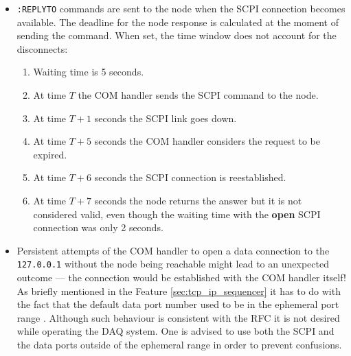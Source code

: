 \begin{itemize}
	\item{
		\texttt{:REPLYTO} commands are sent to the node when the SCPI connection becomes available. The deadline for the node response is calculated at the moment of sending the command. When set, the time window does not account for the disconnects:
		\begin{enumerate}
			\item Waiting time is 5 seconds.
			\item At time $T$ the COM handler sends the SCPI command to the node.
			\item At time $T + 1$ seconds the SCPI link goes down.
			\item At time $T + 5$ seconds the COM handler considers the request to be expired.
			\item At time $T + 6$ seconds the SCPI connection is reestablished.
			\item At time $T + 7$ seconds the node returns the answer but it is not considered valid, even though the waiting time with the \textbf{open} SCPI connection was only 2 seconds.
		\end{enumerate}
	}
	\item Persistent attempts of the COM handler to open a data connection to the \texttt{127.0.0.1} without the node being reachable might lead to an unexpected outcome --- the connection would be established with the COM handler itself! As briefly mentioned in the Feature \ref{sec:tcp_ip_sequencer} it has to do with the fact that the default data port number used to be in the ephemeral port range \cite{RichardStevens1998}. Although such behaviour is consistent with the RFC \cite{Postel1981} it is not desired while operating the DAQ system. One is advised to use both the SCPI and the data ports outside of the ephemeral range in order to prevent confusions.
\end{itemize}
